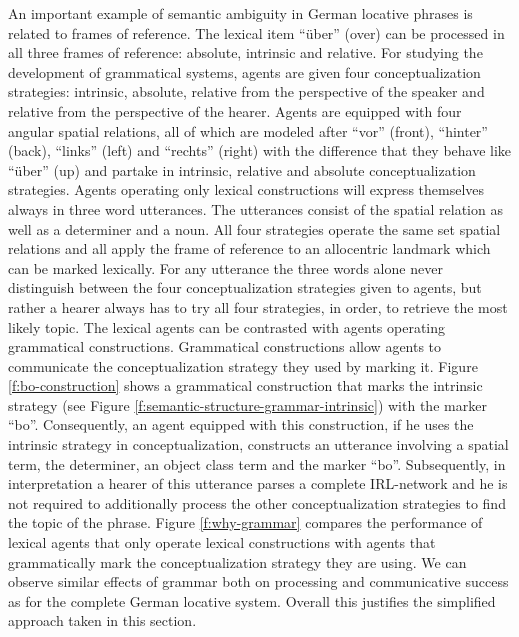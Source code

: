 An important example of semantic ambiguity in German locative phrases is related to
frames of reference. The lexical item ``\"uber'' (over) can
be processed in all three frames of reference: absolute, intrinsic and relative.
For studying the development of grammatical systems, agents are given four conceptualization
strategies: intrinsic, absolute, relative from the perspective of the speaker and relative
from the perspective of the hearer. Agents are equipped with four angular spatial relations, 
all of which are modeled after ``vor'' (front), ``hinter'' (back), ``links'' (left) and ``rechts'' (right) with the difference
that they behave like ``\"uber'' (up) and partake in intrinsic, relative and absolute conceptualization strategies. 
Agents operating only lexical constructions will express themselves always in three word
utterances. The utterances consist of the spatial relation as well as a determiner and a noun. 
All four strategies operate the same set spatial relations and all apply the frame of reference 
to an allocentric landmark which can be marked
lexically. For any utterance the three words alone never distinguish between the 
four conceptualization strategies given to
agents, but rather a hearer always has to try all four strategies, in order, to retrieve the most likely
topic. The lexical agents can be contrasted with agents operating grammatical constructions.
Grammatical constructions allow agents to communicate the conceptualization strategy they used
by marking it. Figure \ref{f:bo-construction} shows a grammatical construction that marks the intrinsic strategy  
(see Figure \ref{f:semantic-structure-grammar-intrinsic})
with the marker ``bo''. Consequently, an agent equipped with this construction,
if he uses the intrinsic strategy in conceptualization, constructs an utterance involving 
a spatial term, the determiner, an object class term and the marker ``bo''. Subsequently, in interpretation a hearer of this utterance parses a complete IRL-network and he is not required to additionally process the other conceptualization strategies to find the topic of 
the phrase. Figure \ref{f:why-grammar} compares the performance of lexical agents that 
only operate lexical constructions with agents that grammatically mark the 
conceptualization strategy they are using. We can observe similar effects of grammar 
both on processing and communicative success as for the complete
German locative system. Overall this justifies the simplified approach taken in this section.

